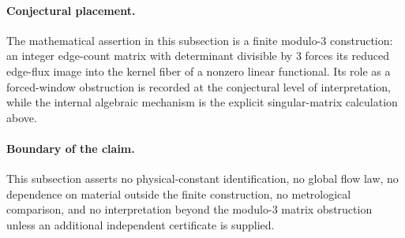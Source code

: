 \paragraph{Conjectural placement.}
The mathematical assertion in this subsection is a finite modulo-$3$ construction: an integer edge-count matrix with determinant divisible by $3$ forces its reduced edge-flux image into the kernel fiber of a nonzero linear functional. Its role as a forced-window obstruction is recorded at the conjectural level of interpretation, while the internal algebraic mechanism is the explicit singular-matrix calculation above.

\paragraph{Boundary of the claim.}
This subsection asserts no physical-constant identification, no global flow law, no dependence on material outside the finite construction, no metrological comparison, and no interpretation beyond the modulo-$3$ matrix obstruction unless an additional independent certificate is supplied.
